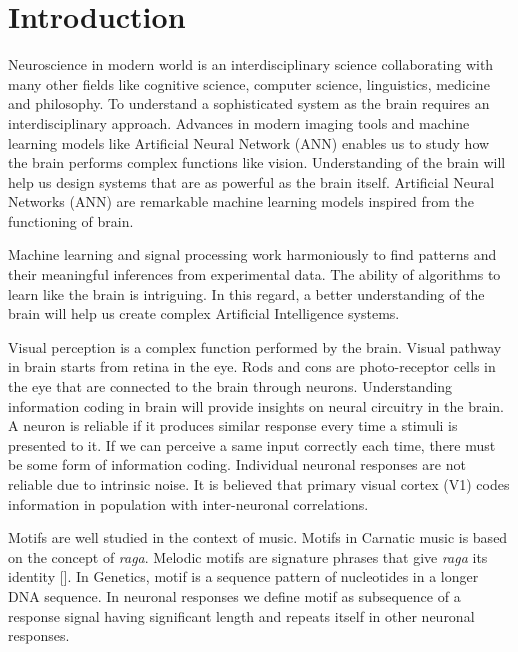 \documentclass[MTech]{iitmdiss}
\begin{document}
 \pagebreak
 \clearpage



\chapter{Introduction}   %
\label{chap:intro}
Neuroscience in modern world is an interdisciplinary science collaborating with many other fields like cognitive science, computer science, linguistics, medicine and philosophy. To understand a sophisticated system as the brain requires an interdisciplinary approach. Advances in modern imaging tools and machine learning models like Artificial Neural Network (ANN) enables us to study how the brain performs complex functions like vision. Understanding of the brain will help us design systems that are as powerful as the brain itself. Artificial Neural Networks (ANN) are remarkable machine learning models inspired from the functioning of brain. 

Machine learning and signal processing work harmoniously to find patterns and their meaningful inferences from experimental data. The ability of algorithms to learn like the brain is intriguing. In this regard, a better understanding of the brain will help us create complex Artificial Intelligence systems.

Visual perception is a complex function performed by the brain. Visual pathway in brain starts from retina in the eye. Rods and cons are photo-receptor cells in the eye that are connected to the brain through neurons. Understanding information coding in brain will provide insights on neural circuitry in the brain. A neuron is reliable if it produces similar response every time a stimuli is presented to it. If we can perceive a same input correctly each time, there must be some form of information coding. Individual neuronal responses are not reliable due to intrinsic noise. It is believed that primary visual cortex (V1) codes information in population with inter-neuronal correlations.


Motifs are well studied in the context of music. Motifs in Carnatic music is based on the concept of \textit{raga}. Melodic motifs are signature phrases that give \textit{raga} its identity [\cite{ishwar2013motif}]. In Genetics, motif is a sequence pattern of nucleotides in a longer DNA sequence. In neuronal responses we define motif as subsequence of a response signal having significant length and repeats itself in other neuronal responses.
\end{document}
